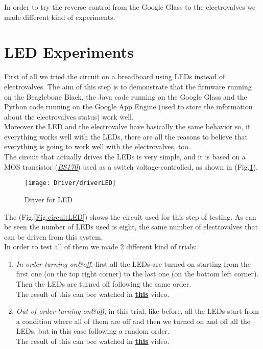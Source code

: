 
	
	In order to try the reverse control from the Google Glass to the electrovalves we made different kind of experiments.
	
	\section{LED Experiments}
	 First of all we tried the circuit on a breadboard using LEDs instead of electrovalves. The aim of this step is to demonstrate that the firmware running on the Beaglebone Black, the Java code running on the Google Glass and the Python code running on the Google App Engine (used to store the information about the electrovalves status) work well.\\
	Moreover the LED and the electrovalve have basically the same behavior so, if everything works well with the LEDs, there are all the reasons to believe that everything is going to work well with the electrovalves, too.\\
	
	The circuit that actually drives the LEDs is very simple, and it is based on a MOS transistor (\href{http://www.onsemi.com/pub_link/Collateral/BS170-D.PDF}{\textit{BS170}}) used as a switch voltage-controlled, as shown in (Fig.\ref{Fig:driverLED}).
	
	\begin{figure}[h]
		\centering
		\texttt{[image: Driver/driverLED]}
		\caption{Driver for LED}
		\label{Fig:driverLED}
	\end{figure}
	
	The (Fig.\ref{Fig:circuitLED}) shows the circuit used for this step of testing. As can be seen the number of LEDs used is eight, the same number of electrovalves that can be driven from this system.\\
	In order to test all of them we made 2 different kind of trials:
	\begin{enumerate}
		\item \textit{In order turning on\&off}, first all the LEDs are turned on starting from the first one (on the top right corner) to the last one (on the bottom left corner). Then the LEDs are turned off following the same order.\\The result of this can bee watched in  \href{http://youtu.be/iYeAMpxM9uI}{\textbf{this}} video.
		\item \textit{Out of order turning on\&off}, in this trial, like before, all the LEDs start from a condition where all of them are off and then we turned on and off all the LEDs, but in this case following a random order.\\ The result of this can bee watched in  \href{http://youtu.be/mIoylW334Ck}{\textbf{this}} video.
	\end{enumerate}
	
